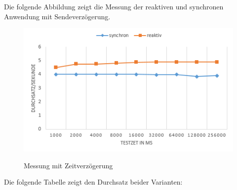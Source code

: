 Die folgende Abbildung zeigt die Messung der reaktiven und synchronen Anwendung mit Sendeverzögerung.
\begin{center}
\begin{figure}[H]
	\caption{Messung mit Zeitverzögerung}
	\centering
  	\includegraphics[width=\textwidth]{media/messung_mit_delay}
	\label{messung_mit_delay}
\end{figure}
\end{center}

Die folgende Tabelle zeigt den Durchsatz beider Varianten: 

